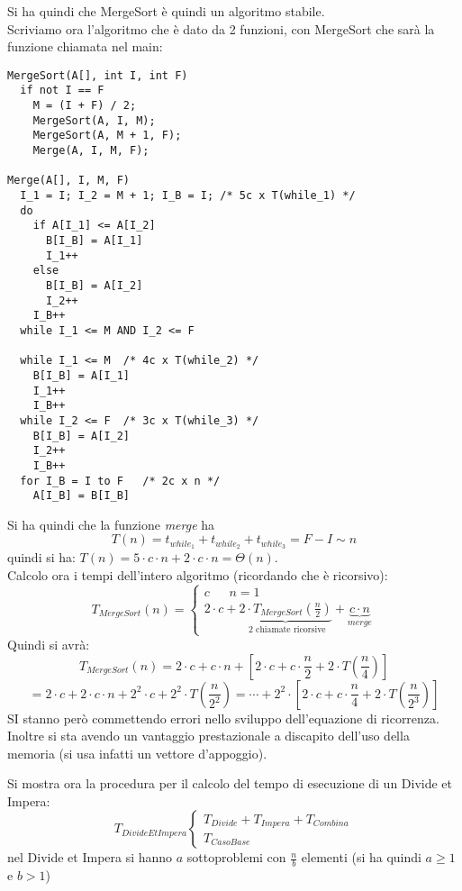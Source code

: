 \documentclass[a4paper,12pt,oneside,tikz]{book}
\begin{document}
\newpage
Si ha quindi che MergeSort è quindi un algoritmo stabile.\\
Scriviamo ora l'algoritmo che è dato da 2 funzioni, con MergeSort che sarà la funzione chiamata nel main:
\begin{verbatim}
MergeSort(A[], int I, int F)
  if not I == F
    M = (I + F) / 2;
    MergeSort(A, I, M);
    MergeSort(A, M + 1, F);
    Merge(A, I, M, F);
    
Merge(A[], I, M, F)
  I_1 = I; I_2 = M + 1; I_B = I; /* 5c x T(while_1) */
  do
    if A[I_1] <= A[I_2]
      B[I_B] = A[I_1]
      I_1++
    else
      B[I_B] = A[I_2]
      I_2++
    I_B++
  while I_1 <= M AND I_2 <= F
  
  while I_1 <= M  /* 4c x T(while_2) */
    B[I_B] = A[I_1]
    I_1++
    I_B++
  while I_2 <= F  /* 3c x T(while_3) */
    B[I_B] = A[I_2]
    I_2++
    I_B++
  for I_B = I to F   /* 2c x n */
    A[I_B] = B[I_B]
\end{verbatim}
Si ha quindi che la funzione \textit{merge} ha $$T(n)=t_{while_1}+t_{while_2}+t_{while_3}=F-I\sim n$$ quindi si ha: $T(n)=5\cdot c\cdot n+2\cdot c\cdot n=\Theta(n)$.\\
Calcolo ora i tempi dell'intero algoritmo (ricordando che è ricorsivo):
$$T_{MergeSort}(n)=\begin{cases}
c \,\,\,\,\,\,\,\,\ n=1\\
2\cdot c+\underbrace{2\cdot T_{MergeSort}\left(\frac{n}{2}\right)}_{\mbox{ 2 chiamate ricorsive}}+\underbrace{c\cdot n }_{merge}
\end{cases}$$
Quindi si avrà:
$$T_{MergeSort}(n)=2\cdot c+ c\cdot n+\left[2\cdot c+c\cdot \frac{n}{2}+2\cdot T\left(\frac{n}{4}\right)\right]$$
$$=2\cdot c+2\cdot c\cdot n+2^2\cdot c+2^2\cdot T\left(\frac{n}{2^2}\right)=\cdots+2^2\cdot\left[ 2\cdot c+c\cdot \frac{n}{4}+2\cdot T\left(\frac{n}{2^3}\right)\right] $$
SI stanno però commettendo errori nello sviluppo dell'equazione di ricorrenza. Inoltre si sta avendo un vantaggio prestazionale a discapito dell'uso della memoria (si usa infatti un vettore d'appoggio).
\begin{shaded}
\begin{nota}
Si mostra ora la procedura per il calcolo del tempo di esecuzione di un Divide et Impera:
$$T_{DivideEtImpera}\begin{cases}
T_{Divide}+T_{Impera}+T_{Combina}\\
T_{CasoBase}
\end{cases}$$
nel Divide et Impera si hanno $a$ sottoproblemi con $\frac{n}{b}$ elementi (si ha quindi $a\geq 1$ e $b>1$)
\end{nota}
\end{shaded}
\end{document}
